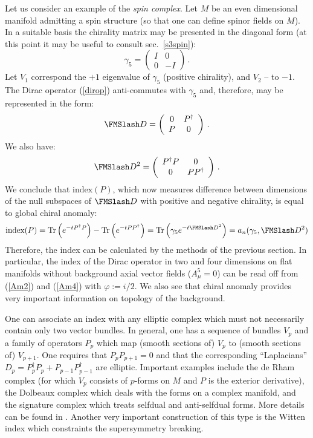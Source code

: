 Let us consider an example of the {\it spin complex}. Let $M$ be
an even dimensional manifold admitting a spin structure (so that
one can define spinor fields on $M$). In a suitable basis
the chirality matrix may be presented in the diagonal form
(at this point it may be useful to consult sec.\ \ref{s3spin}):
\begin{equation}
\gamma_5 =
\left( \begin{array}{cc}
I & 0 \\
0 & -I \end{array} \right)\,.
\label{diag5} \end{equation}
Let $V_1$ correspond the $+1$ eigenvalue of $\gamma_5$ (positive
chirality), and $V_2$ -- to $-1$. The Dirac operator (\ref{dirop})
anti-commutes with $\gamma_5$ and, therefore, may be represented
in the form:
\begin{equation}
\Dir = \left( \begin{array}{cc} 0 & P^\dag \\ P & 0
\end{array} \right) \,. \label{adiagdir}
\end{equation}
We also have:
\begin{equation}
\Dir^2 = \left( \begin{array}{cc} P^\dag P & 0\\ 0 & PP^\dag 
\end{array} \right) \,. \label{dirsq}
\end{equation}
We conclude that $\mbox{index}(P)$, which now measures difference
between dimensions of the null subspaces of $\Dir$ with positive and
negative chirality, is equal to global chiral anomaly:
\begin{equation}
\mbox{index}(P)={\rm Tr} \left( e^{-tP^\dag P} \right)
-{\rm Tr} \left( e^{-tPP^\dag }\right) =
{\rm Tr} \left( \gamma_5 e^{-t\Dir^2}\right)=a_n (\gamma_5,\Dir^2)
 \label{Dindex}
\end{equation}
Therefore, the index can be calculated by the methods of the previous
section. In particular, the index of the Dirac operator in two and
four dimensions on flat manifolds without background axial vector
fields ($A_\mu^5=0$) can be read off from (\ref{Am2}) and (\ref{Am4})
with $\varphi :=i/2$.
We also see that chiral anomaly provides very important
information on topology of the background.

One can associate an index with any elliptic complex which must not
necessarily contain only two vector bundles. In general,
one has a sequence of bundles $V_p$ and a family of operators
$P_p$ which map (smooth sections of) $V_p$ to (smooth sections of)
$V_{p+1}$. One requires that $P_{p}P_{p+1}=0$ and that the corresponding
``Laplacians'' $D_p=P^\dag_p P_p + P_{p-1}P_{p-1}^\dag$ are elliptic.
Important examples include the de Rham complex (for which $V_p$ consists
of $p$-forms on $M$ and $P$ is the exterior derivative), the
Dolbeaux complex which deals with the forms on a complex manifold,
and the signature complex which treats selfdual and anti-selfdual
forms. More details can be found in \cite{Eguchi:1980jx}.
Another very important construction of this type is the
Witten index \cite{Witten:1982df} which constraints the supersymmetry
breaking.